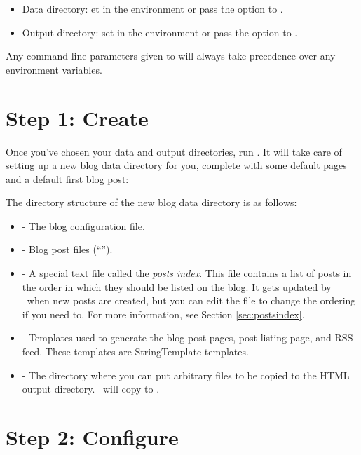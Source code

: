 \documentclass[11pt, letterpaper, oneside, titlepage]{book}
\begin{document}
\begin{itemize}
\item{Data directory: et  in the environment or pass
  the  option to .}
\item{Output directory: set  in the environment or
  pass the  option to .}
\end{itemize}

Any command line parameters given to  will always take
precedence over any environment variables.

\section{Step 1: Create}

Once you've chosen your data and output directories, run .
It will take care of setting up a new blog data directory for you,
complete with some default pages and a default first blog post:


The directory structure of the new blog data directory is as follows:

\begin{itemize}
\item{ - The blog configuration file.}
\item{ - Blog post files (``'').}
\item{ - A special text file called the
  \textit{posts index}.  This file contains a list of posts in the
  order in which they should be listed on the blog.  It gets updated
  by \mathblog\ when new posts are created, but you can edit the file
  to change the ordering if you need to.  For more information, see
  Section \ref{sec:postsindex}.}
\item{ - Templates used to generate the blog post
  pages, post listing page, and RSS feed.  These templates are
  StringTemplate templates.}
\item{ - The directory where you can put arbitrary files
  to be copied to the HTML output directory.  \mathblog\ will copy
   to .}
\end{itemize}

\section{Step 2: Configure}
\end{document}
